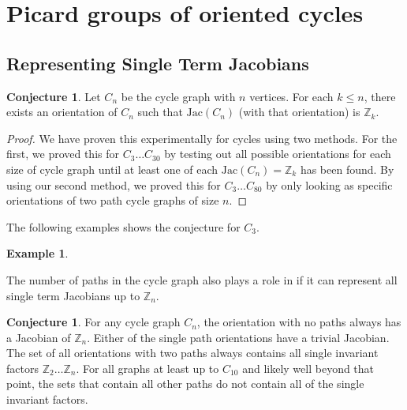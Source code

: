 \documentclass[11pt,reqno]{amsart}
\newcommand{\Jac}{\textrm{Jac}}{}
\theoremstyle{definition}
\newtheorem{myeg}[mydef]{\textbf{Example}}
\newtheorem{conj}[mydef]{\textbf{Conjecture}}
\theoremstyle{plain}
\begin{document}
\section{Picard groups of oriented cycles}

	\subsection{Representing Single Term Jacobians}
		\begin{conj}
			Let $C_n$ be the cycle graph with $n$ vertices. For each $k \leq n$, there exists an orientation of $C_n$
			such that $\Jac(C_n)$ (with that orientation) is $\mathbb{Z}_k$.
		\end{conj}
		\begin{proof}
			We have proven this experimentally for cycles using two methods.  For the first, we proved this for
			$C_3 \dots C_{30}$ by testing out all possible orientations for each size of cycle graph until at least one
			of each $\Jac(C_n)=\mathbb{Z}_k$ has been found.  By using our second method, we proved this for
			$C_3\dots C_{80}$ by only looking as specific orientations of two path cycle graphs of size $n$.
		\end{proof}

		The following examples shows the conjecture for $C_3$.

		\begin{myeg}


		\end{myeg}

		The number of paths in the cycle graph also plays a role in if it can represent all single term Jacobians up
		to $\mathbb{Z}_n$.

		\begin{conj}
			For any cycle graph $C_n$, the orientation with no paths always has a Jacobian of $\mathbb{Z}_n$.
			Either of the single path orientations have a trivial Jacobian.
			The set of all orientations with two paths always contains all single invariant factors
			$\mathbb{Z}_2\dots\mathbb{Z}_n$.  For all graphs at least up to $C_{10}$ and likely well beyond that
			point, the sets that contain all other paths do not contain all of the single invariant factors.
		\end{conj}
\end{document}
